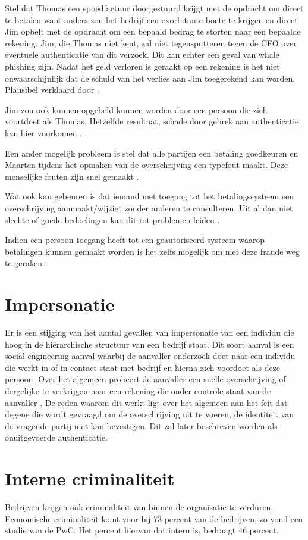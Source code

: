 Stel dat Thomas een spoedfactuur doorgestuurd krijgt met de opdracht om direct
te betalen want anders zou het bedrijf een exorbitante boete te krijgen en
direct Jim opbelt met de opdracht om een bepaald bedrag te storten naar een
bepaalde rekening. Jim, die Thomas niet kent, zal niet tegensputteren tegen de
CFO over eventuele authenticatie van dit verzoek. Dit kan echter een geval van
whale phishing zijn. Nadat het geld verloren is geraakt op een rekening is het
niet onwaarschijnlijk dat de schuld van het verlies aan Jim toegerekend kan
worden. Plausibel verklaard door \textcite{VanDenBulckeTom}.

Jim zou ook kunnen opgebeld kunnen worden door een persoon die zich voortdoet
als Thomas. Hetzelfde resultaat, schade door gebrek aan authenticatie, kan hier
voorkomen \autocite{VanDenBulckeTom, VanDerBeekImpersonatieMarqit}.

Een ander mogelijk probleem is stel dat alle partijen een betaling goedkeuren en
Maarten tijdens het opmaken van de overschrijving een typefout maakt. Deze
menselijke fouten zijn snel gemaakt \autocite{VanDenBulckeTom, DeprezArne}.

Wat ook kan gebeuren is dat iemand met toegang tot het betalingssysteem een
overschrijving aanmaakt/wijzigt zonder anderen te consulteren. Uit al dan niet
slechte of goede bedoelingen kan dit tot problemen leiden
\autocite{VanDenBulckeTom, DeprezArne}.

Indien een persoon toegang heeft tot een geautoriseerd systeem waarop betalingen
kunnen gemaakt worden is het zelfs mogelijk om met deze fraude weg te geraken
\autocite{VanDenBulckeTom}.

\section{Impersonatie}
Er is een stijging van het aantal gevallen van impersonatie van een individu die
hoog in de hiërarchische structuur van een bedrijf staat. Dit soort aanval is
een social engineering aanval waarbij de aanvaller onderzoek doet naar een
individu die werkt in of in contact staat met bedrijf en hierna zich voordoet
als deze persoon. Over het algemeen probeert de aanvaller een snelle
overschrijving of dergelijke te verkrijgen naar een rekening die onder controle
staat van de aanvaller \autocite{VanDerBeekImpersonatieMarqit,
	DeignImpersonatieTheGuardian}. De reden waarom dit werkt ligt over het algemeen
aan het feit dat degene die wordt gevraagd om de overschrijving uit te voeren,
de identiteit van de vragende partij niet kan bevestigen. Dit zal later
beschreven worden als onuitgevoerde authenticatie.

\section{Interne criminaliteit}
Bedrijven krijgen ook criminaliteit van binnen de organisatie te verduren.
Economische criminaliteit komt voor bij 73 percent van de bedrijven, zo vond een
studie van de PwC. Het percent hiervan dat intern is, bedraagt 46 percent.
\autocite{EconomicCrimeSurvey, Ashford2015}
